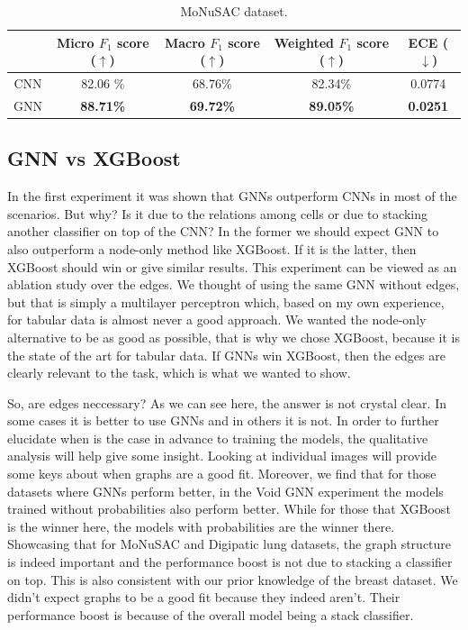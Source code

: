 \begin{table}[ht]
\vspace{0.5cm}


\begin{tabular}{c|c|c|c|c|}
  \cline{2-5}
  & Micro $F_1$ score ($\uparrow$) & Macro $F_1$ score ($\uparrow$) & Weighted $F_1$ score ($\uparrow$) & ECE ($\downarrow$) \\ \hline
\multicolumn{1}{|c|}{CNN}  & 82.06 \% & 68.76\% & 82.34\% & 0.0774 \\ \hline
\multicolumn{1}{|c|}{GNN}  & \textbf{88.71\%} & \textbf{69.72\%} & \textbf{89.05\%} & \textbf{0.0251}  \\ \hline
\end{tabular}
\caption{MoNuSAC dataset.}
\end{table}

\newpage
\subsection{GNN vs XGBoost}

In the first experiment it was shown that GNNs outperform CNNs in most of the scenarios. But why? Is it due to the relations among cells or due to stacking another classifier on top of the CNN? In the former we should expect GNN to also outperform a node-only method like XGBoost. If it is the latter, then XGBoost should win or give similar results. This experiment can be viewed as an ablation study over the edges. We thought of using the same GNN without edges, but that is simply a multilayer perceptron which, based on my own experience, for tabular data is almost never a good approach. We wanted the node-only alternative to be as good as possible, that is why we chose XGBoost, because it is the state of the art for tabular data. If GNNs win XGBoost, then the edges are clearly relevant to the task, which is what we wanted to show.

So, are edges neccessary? As we can see here, the answer is not crystal clear. In some cases it is better to use GNNs and in others it is not. In order to further elucidate when is the case in advance to training the models, the qualitative analysis will help give some insight. Looking at individual images will provide some keys about when graphs are a good fit. Moreover, we find that for those datasets where GNNs perform better, in the Void GNN experiment the models trained without probabilities also perform better. While for those that XGBoost is the winner here, the models with probabilities are the winner there. Showcasing that for MoNuSAC and Digipatic lung datasets, the graph structure is indeed important and the performance boost is not due to stacking a classifier on top. This is also consistent with our prior knowledge of the breast dataset. We didn't expect graphs to be a good fit because they indeed aren't. Their performance boost is because of the overall model being a stack classifier.

